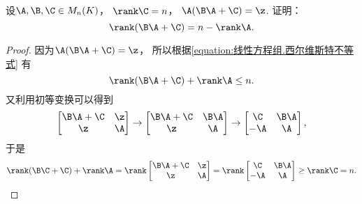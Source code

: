 \begin{example}
设\(\A,\B,\C \in M_n(K)\)，
\(\rank\C=n\)，
\(\A(\B\A+\C)=\z\).
证明：\[
	\rank(\B\A+\C)=n-\rank\A.
\]
\begin{proof}
因为\(\A(\B\A+\C)=\z\)，
所以根据\cref{equation:线性方程组.西尔维斯特不等式} 有\[
	\rank(\B\A+\C)+\rank\A \leq n.
\]
又利用初等变换可以得到\[
	\begin{bmatrix}
		\B\A+\C & \z \\
		\z & \A
	\end{bmatrix}
	\to \begin{bmatrix}
		\B\A+\C & \B\A \\
		\z & \A
	\end{bmatrix}
	\to \begin{bmatrix}
		\C & \B\A \\
		-\A & \A
	\end{bmatrix},
\]
于是\[
	\rank(\B\C+\C)
	+\rank\A
	= \rank\begin{bmatrix}
		\B\A+\C & \z \\
		\z & \A
	\end{bmatrix}
	= \rank\begin{bmatrix}
		\C & \B\A \\
		-\A & \A
	\end{bmatrix}
	\geq \rank\C = n.
	\qedhere
\]
\end{proof}
\end{example}
